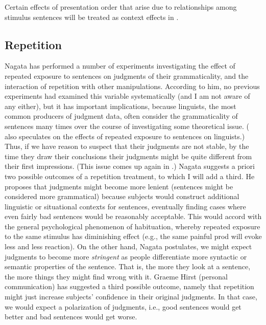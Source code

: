 Certain effects of presentation order that arise due to relationships among stimulus sentences will be treated as context effects in .

\subsection{Repetition}\label{sec:5.2.3}

Nagata has performed a number of experiments investigating the effect of repeated exposure to sentences on judgments of their grammaticality, and the interaction of repetition with other manipulations. According to him, no previous experiments had examined this variable systematically (and I am not aware of any either), but it has important implications, because linguists, the most common producers of judgment data, often consider the grammaticality of sentences many times over the course of investigating some theoretical issue. (\citet{Spencer1973} 
also speculates on the effects of repeated exposure to sentences on linguists.) Thus, if we have reason to suspect that their judgments are not stable, by the time they draw their conclusions their judgments might be quite different from their first impressions. (This issue comes up again in .) Nagata suggests a priori two possible outcomes of a repetition treatment, to which I will add a third. He proposes that judgments might become more lenient (sentences might be considered more grammatical) because subjects would construct additional linguistic or situational contexts for sentences, eventually finding cases where even fairly bad sentences would be reasonably acceptable. This would accord with the general psychological phenomenon of habituation, whereby repeated exposure to the same stimulus has diminishing effect (e.g., the same painful prod will evoke less and less reaction). On the other hand, Nagata postulates, we might expect judgments to become more \textit{stringent} as people differentiate more syntactic or semantic properties of the sentence. That is, the more they look at a sentence, the more things they might find wrong with it. Graeme Hirst (personal communication) has suggested a third possible outcome, namely that repetition might just increase subjects' confidence in their original judgments. In that case, we would expect a polarization of judgments, i.e., good sentences would get better and bad sentences would get worse.

